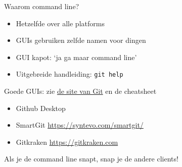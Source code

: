 \begin{frame}{Waarom command line?}
	\begin{itemize}
		\item Hetzelfde over alle platforms
		\item GUIs gebruiken zelfde namen voor dingen
		\item GUI kapot: `ja ga maar command line'
		\item Uitgebreide handleiding: \texttt{git help}
	\end{itemize}
	Goede GUIs: zie \href{https://git-scm.com/downloads/guis}{de site van Git} en de cheatsheet
	\begin{itemize}
		\item Github Desktop
		\item SmartGit \url{https://syntevo.com/smartgit/}
		\item Gitkraken \url{https://gitkraken.com}
	\end{itemize}
	Als je de command line snapt, snap je de andere clients!
\end{frame}
